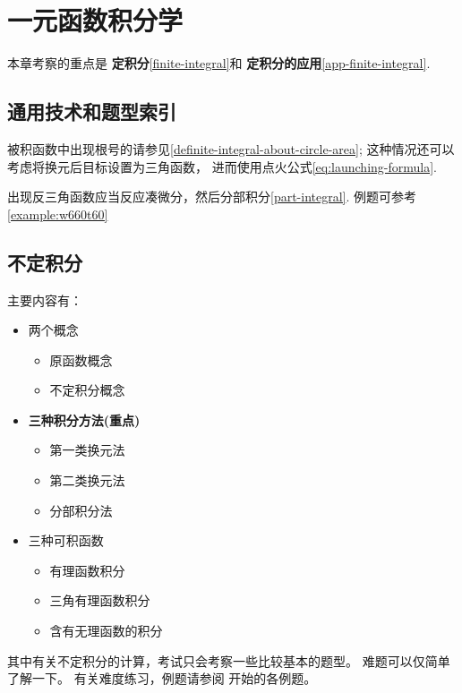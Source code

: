 \chapter{一元函数积分学}

本章考察的重点是
\textbf{定积分}\ref{finite-integral}和
\textbf{定积分的应用}\ref{app-finite-integral}.

\section{通用技术和题型索引}

被积函数中出现根号的请参见\ref{definite-integral-about-circle-area};
这种情况还可以考虑将换元后目标设置为三角函数，
进而使用点火公式\ref{eq:launching-formula}.

出现反三角函数应当反应凑微分，然后分部积分\ref{part-integral}.
例题可参考\ref{example:w660t60}

\section{不定积分} \label{infinite-integral}

主要内容有：
\begin{itemize}
    \item 两个概念
        \begin{itemize}
            \item 原函数概念
            \item 不定积分概念
        \end{itemize}
    \item \textbf{三种积分方法(重点)}
        \begin{itemize}
            \item 第一类换元法
            \item 第二类换元法
            \item 分部积分法
        \end{itemize}
    \item 三种可积函数
        \begin{itemize}
            \item 有理函数积分
            \item 三角有理函数积分
            \item 含有无理函数的积分
        \end{itemize}
\end{itemize}
其中有关不定积分的计算，考试只会考察一些比较基本的题型。
难题可以仅简单了解一下。
有关难度练习，例题请参阅 \cite[page 96]{we} 开始的各例题。

